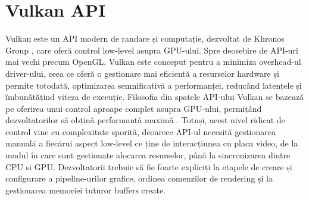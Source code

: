 \section{Vulkan API}
Vulkan este un API modern de randare și computație, dezvoltat de Khronos Group \cite{KhronosGroup_citation}, care oferă control low-level asupra GPU-ului. Spre deosebire de API-uri mai vechi precum OpenGL, Vulkan este conceput pentru a minimiza overhead-ul driver-ului, ceea ce oferă o gestionare mai eficientă a resurselor hardware și permite totodată, optimizarea semnificativă a performanței, reducând latențele și îmbunătățind viteza de execuție. Filosofia din spatele API-ului Vulkan se bazează pe oferirea unui control aproape complet asupra GPU-ului, permițând dezvoltatorilor să obțină performanță maximă \cite{VulkanPhilosophy_citation}. Totuși, acest nivel ridicat de control vine cu complexitate sporită, deoarece API-ul necesită gestionarea manuală a fiecărui aspect low-level ce ține de interacțiunea cu placa video, de la modul în care sunt gestionate alocarea resurselor, până la sincronizarea dintre CPU si GPU. Dezvoltatorii trebuie să fie foarte expliciți la etapele de creare și configurare a pipeline-urilor grafice, ordinea comenzilor de rendering și la gestionarea memoriei tuturor buffers create. 

